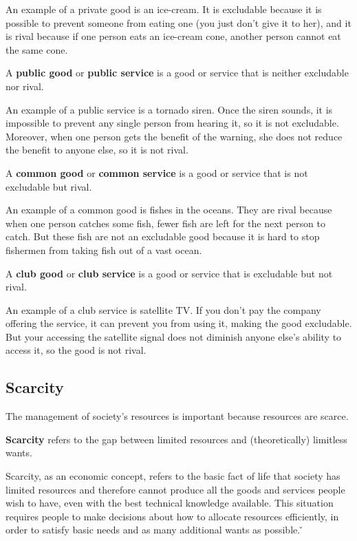\be
An example of a private good is an ice-cream. It is excludable because it is possible to prevent someone from eating
one (you just don't give it to her), and it is rival because if one person eats an ice-cream cone, another person
cannot eat the same cone.
\ee

A \textbf{public good} or \textbf{public service} is a good or service that is neither excludable nor rival.
\ed

\be
An example of a public service is a tornado siren. Once the siren sounds, it is impossible to prevent any single person
from hearing it, so it is not excludable. Moreover, when one person gets the benefit of the warning, she does not
reduce the benefit to anyone else, so it is not rival.
\ee

A \textbf{common good} or \textbf{common service} is a good or service that is not excludable but rival.
\ed

\be
An example of a common good is fishes in the oceans. They are rival because when one person catches some fish, fewer
fish are left for the next person to catch. But these fish are not an excludable good because it is hard to stop
fishermen from taking fish out of a vast ocean.
\ee

A \textbf{club good} or \textbf{club service} is a good or service that is excludable but not rival.
\ed

\be
An example of a club service is satellite TV. If you don't pay the company offering the service, it can prevent you from
using it, making the good excludable. But your accessing the satellite signal does not diminish anyone else's ability
to access it, so the good is not rival.
\ee

\subsection{Scarcity}

The management of society's resources is important because resources are scarce.

\bd[Scarcity]
\textbf{Scarcity} refers to the gap between limited resources and (theoretically) limitless wants.
\ed

Scarcity, as an economic concept, refers to the basic fact of life that society has limited resources and therefore
cannot produce all the goods and services people wish to have, even with the best technical knowledge available. This
situation requires people to make decisions about how to allocate resources efficiently, in order to satisfy basic
needs and as many additional wants as possible. \v

